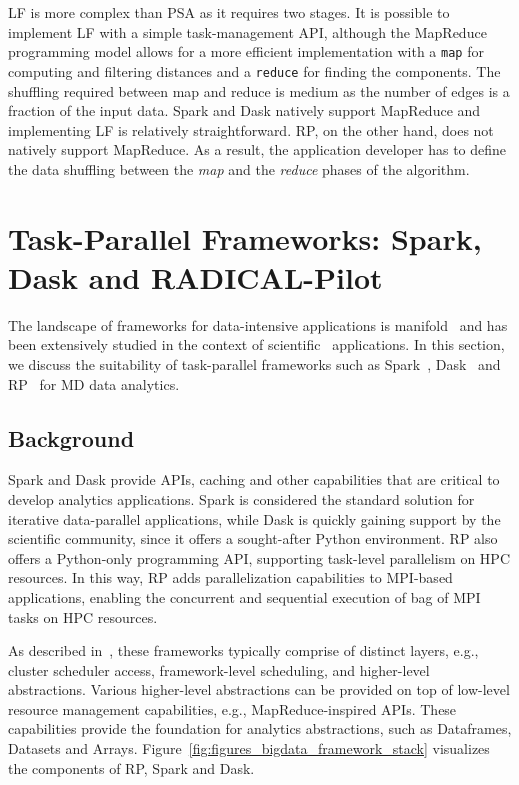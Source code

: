 LF is more complex than PSA as it requires two stages. It is possible to
implement LF with a simple task-management API, although the MapReduce
programming model allows for a more efficient implementation with a \texttt{map}
for computing and filtering distances and a \texttt{reduce} for finding the
components. The shuffling required between map and reduce is medium as the
number of edges is a fraction of the input data. Spark and Dask natively support
MapReduce and implementing LF is relatively straightforward. RP, on
the other hand, does not natively support MapReduce. As a result, the
application developer has to define the data shuffling between the \emph{map}
and the \emph{reduce} phases of the algorithm.

\section{Task-Parallel Frameworks: Spark, Dask and RADICAL-Pilot}
\label{sec:frameworks}

The landscape of frameworks for data-intensive applications is
manifold~\cite{jha2014tale,kamburugamuve2017anatomy} and has been extensively
studied in the context of scientific~\cite{jha2017introducing} applications. In
this section, we discuss the suitability of task-parallel frameworks such as
Spark~\cite{zaharia2010spark}, Dask~\cite{rocklin2015dask} and
RP~\cite{merzky2019using} for MD data analytics.

\subsection{Background}

Spark and Dask provide APIs, caching and other capabilities that are critical to
develop analytics applications. Spark is considered the standard solution for
iterative data-parallel applications, while Dask is quickly gaining support by
the scientific community, since it offers a sought-after Python environment.
RP also offers a Python-only programming API, supporting task-level
parallelism on HPC resources. In this way, RP adds parallelization
capabilities to MPI-based applications, enabling the concurrent and sequential
execution of bag of MPI tasks on HPC resources.

As described in~\cite{jha2014tale}, these frameworks typically comprise of
distinct layers, e.g., cluster scheduler access, framework-level scheduling, and
higher-level abstractions. Various higher-level abstractions can be provided on
top of low-level resource management capabilities, e.g., MapReduce-inspired
APIs. These capabilities provide the foundation for analytics abstractions, such
as Dataframes, Datasets and Arrays.
Figure~\ref{fig:figures_bigdata_framework_stack} visualizes the components of
RP, Spark and Dask.

